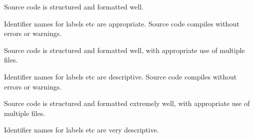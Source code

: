 \documentclass{../../../fal_assignment}
\begin{document}
\begin{markingrubric}
			\par Source code is structured and formatted well.
			\par Identifier names for labels etc are appropriate.
		\grade Source code compiles without errors or warnings.
			\par Source code is structured and formatted well, with appropriate use of multiple files.
			\par Identifier names for labels etc are descriptive.
		\grade Source code compiles without errors or warnings.
			\par Source code is structured and formatted extremely well, with appropriate use of multiple files.
			\par Identifier names for labels etc are very descriptive.
\end{markingrubric}
\end{document}
